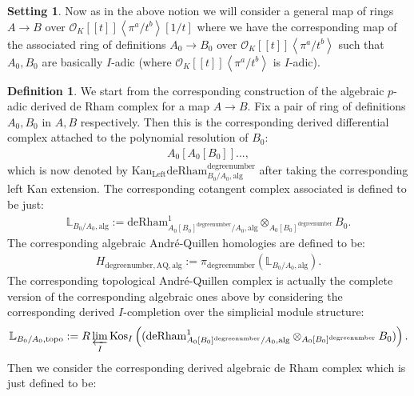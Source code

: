 \documentclass[11pt]{book}
\theoremstyle{definition}
\newtheorem{definition}[theorem]{Definition}
\numberwithin{equation}{section}
\newtheorem{setting}[theorem]{Setting}
\begin{document}
\begin{setting}
Now as in the above notion we will consider a general map of rings $A\rightarrow B$ over $\mathcal{O}_K[[t]]\left<\pi^a/t^b\right>[1/t]$ where we have the corresponding map of the associated ring of definitions $A_0\rightarrow B_0$ over $\mathcal{O}_K[[t]]\left<\pi^a/t^b\right>$ such that $A_0,B_0$ are basically $I$-adic (where $\mathcal{O}_K[[t]]\left<\pi^a/t^b\right>$ is $I$-adic).	
\end{setting}
 
 
 
 

\begin{definition}
We start from the corresponding construction of the algebraic $p$-adic derived de Rham complex for a map $A\rightarrow B$. Fix a pair of ring of definitions $A_0,B_0$ in $A,B$ respectively. Then this is the corresponding derived differential complex attached to the polynomial resolution of $B_0$:
\begin{align}
A_0[A_0[B_0]]...,	
\end{align}
which is now denoted by $\mathrm{Kan}_\mathrm{Left}\mathrm{deRham}^\text{degreenumber}_{B_0/A_0,\mathrm{alg}}$ after taking the corresponding left Kan extension. The corresponding cotangent complex associated is defined to be just:
\begin{align}
\mathbb{L}_{B_0/A_0,\mathrm{alg}}:=	\mathrm{deRham}^1_{A_0[B_0]^\text{degreenumber}/A_0,\mathrm{alg}}\otimes_{A_0[B_0]^\text{degreenumber}} B_0.
\end{align}
The corresponding algebraic Andr\'e-Quillen homologies are defined to be:
\begin{align}
H_{\text{degreenumber},{\mathrm{AQ}},\mathrm{alg}}:=\pi_\text{degreenumber} (\mathbb{L}_{B_0/A_0,\mathrm{alg}}). 	
\end{align}
The corresponding topological Andr\'e-Quillen complex is actually the complete version of the corresponding algebraic ones above by considering the corresponding derived $I$-completion over the simplicial module structure:
\begin{align}
\mathbb{L}_{B_0/A_0,\mathrm{topo}}:=R\varprojlim_I \mathrm{Kos}_{I}	\left((\mathrm{deRham}^1_{A_0[B_0]^\text{degreenumber}/A_0,\mathrm{alg}}\otimes_{A_0[B_0]^\text{degreenumber}} B_0)\right).
\end{align}
Then we consider the corresponding derived algebraic de Rham complex which is just defined to be:
\begin{align}

\end{align}
\end{definition}
\end{document}
